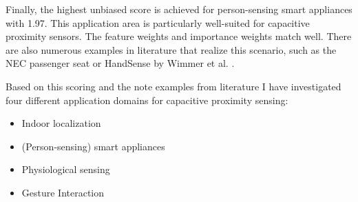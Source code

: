 Finally, the highest unbiased score is achieved for person-sensing smart appliances with 1.97. This application area is particularly well-suited for capacitive proximity sensors. The feature weights and importance weights match well. There are also numerous examples in literature that realize this scenario, such as the NEC passenger seat \cite{smith1999thesis} or HandSense by Wimmer et al. \cite{wimmer2009handsense}.

Based on this scoring and the note examples from literature I have investigated four different application domains for capacitive proximity sensing:
\begin{itemize}
\item Indoor localization
\item (Person-sensing) smart appliances
\item Physiological sensing
\item Gesture Interaction
\end{itemize}